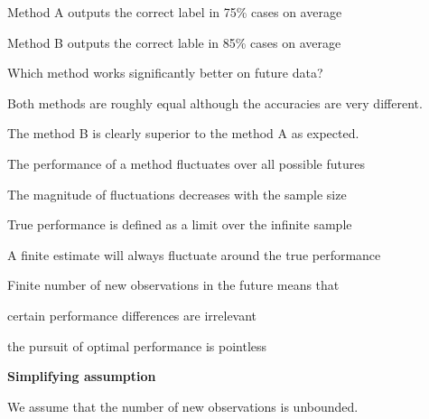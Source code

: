 \documentclass[landscape,footrule]{foils}
\begin{document}
\begin{triangles}
\item Method A outputs the correct label in 75\% cases on average
\item Method B outputs the correct lable in 85\% cases on average
\item Which method works significantly better on future data? 
\end{triangles} 






Both methods are roughly equal although the accuracies are very different. 



The method B is clearly superior to the method A as expected. 


\begin{triangles}
\item The performance of a method fluctuates over all possible futures
\item The magnitude of fluctuations decreases with the sample size
\item True performance is defined as a limit over the infinite sample
\item A finite estimate will always fluctuate around the true performance
\end{triangles}
\vspace*{1.5cm}

Finite number of new observations in the future means that
\begin{triangles}
\item certain performance differences are irrelevant
\item the pursuit of optimal performance is pointless
\end{triangles}

\vspace*{2.0cm}
\textbf{Simplifying assumption}
\begin{triangles}
\item We assume that the number of new observations is unbounded.
\end{triangles}
\end{document}
